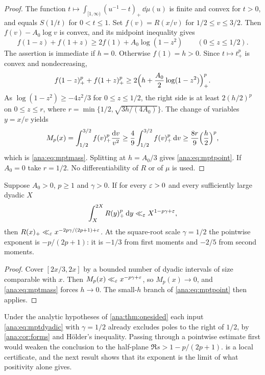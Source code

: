 \begin{proof}
The function $t\mapsto\int_{[1,\infty)}(u^{-1}-t)_+\,\dd\mu(u)$ is finite and convex for $t>0$,
and equals $S(1/t)$ for $0<t\le1$. Set $f(v)=R(x/v)$ for $1/2\le v\le3/2$. Then
$f(v)-A_0\log v$ is convex, and its midpoint inequality gives
\[
 f(1-z)+f(1+z)\ge2f(1)+A_0\log(1-z^2)\qquad(0\le z\le1/2).
\]
The assertion is immediate if $h=0$. Otherwise $f(1)=h>0$. Since $t\mapsto t_+^p$ is convex and
nondecreasing,
\[
 f(1-z)_+^p+f(1+z)_+^p\ge2\Bigl(h+\frac{A_0}2\log(1-z^2)\Bigr)_+^p .
\]
As $\log(1-z^2)\ge-4z^2/3$ for $0\le z\le1/2$, the right side is at least $2(h/2)^p$ on
$0\le z\le r$, where $r=\min\{1/2,\sqrt{3h/(4A_0)}\}$. The change of variables $y=x/v$ yields
\[
 M_p(x)=\int_{1/2}^{3/2}f(v)_+^p\frac{\mathrm{d} v}{v^2}\ge\frac49\int_{1/2}^{3/2}f(v)_+^p\,\mathrm{d} v
 \ge\frac{8r}9\Bigl(\frac h2\Bigr)^p,
\]
which is \eqref{ana:eq:mptmass}. Splitting at $h=A_0/3$ gives \eqref{ana:eq:mptpoint}. If
$A_0=0$ take $r=1/2$. No differentiability of $R$ or of $\mu$ is used.
\end{proof}

\begin{corollary}\label{ana:cor:mpt}
Suppose $A_0>0$, $p\ge1$ and $\gamma>0$. If for every $\varepsilon>0$ and every sufficiently large
dyadic $X$
\begin{equation}\label{ana:eq:mptdyadic}
 \int_X^{2X}R(y)_+^p\,\mathrm{d} y\ll_\varepsilon X^{1-p\gamma+\varepsilon},
\end{equation}
then $R(x)_+\ll_\varepsilon x^{-2p\gamma/(2p+1)+\varepsilon}$. At the square-root scale $\gamma=1/2$ the
pointwise exponent is $-p/(2p+1)$: it is $-1/3$ from first moments and $-2/5$ from second
moments.
\end{corollary}

\begin{proof}
Cover $[2x/3,2x]$ by a bounded number of dyadic intervals of size comparable with $x$. Then
$M_p(x)\ll_\varepsilon x^{-p\gamma+\varepsilon}$, so $M_p(x)\to0$, and \eqref{ana:eq:mptmass} forces $h\to0$.
The small-$h$ branch of \eqref{ana:eq:mptpoint} then applies.
\end{proof}

Under the analytic hypotheses of \cref{ana:thm:onesided} each input \eqref{ana:eq:mptdyadic}
with $\gamma=1/2$ already excludes poles to the right of $1/2$, by \cref{ana:cor:forms} and
H\"older's inequality. Passing through a pointwise estimate first would weaken the conclusion
to the half-plane $\Re s>1-p/(2p+1)$.  is a local certificate, and the next
result shows that its exponent is the limit of what positivity alone gives.

